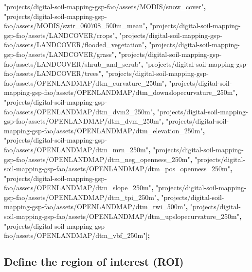 \documentclass[
  10pt,
  b5paper,
  oneside]{book}
\newenvironment{Shaded}{\begin{snugshade}}{\end{snugshade}}
\newcommand{\NormalTok}[1]{#1}
\newcommand{\OperatorTok}[1]{\textcolor[rgb]{0.81,0.36,0.00}{\textbf{#1}}}
\newcommand{\StringTok}[1]{\textcolor[rgb]{0.31,0.60,0.02}{#1}}
\begin{document}
\begin{Shaded}
\begin{Highlighting}[]
\StringTok{"projects/digital{-}soil{-}mapping{-}gsp{-}fao/assets/MODIS/snow\_cover"}\OperatorTok{,}
\StringTok{"projects/digital{-}soil{-}mapping{-}gsp{-}fao/assets/MODIS/swir\_060708\_500m\_mean"}\OperatorTok{,}
\StringTok{"projects/digital{-}soil{-}mapping{-}gsp{-}fao/assets/LANDCOVER/crops"}\OperatorTok{,}
\StringTok{"projects/digital{-}soil{-}mapping{-}gsp{-}fao/assets/LANDCOVER/flooded\_vegetation"}\OperatorTok{,}
\StringTok{"projects/digital{-}soil{-}mapping{-}gsp{-}fao/assets/LANDCOVER/grass"}\OperatorTok{,}
\StringTok{"projects/digital{-}soil{-}mapping{-}gsp{-}fao/assets/LANDCOVER/shrub\_and\_scrub"}\OperatorTok{,}
\StringTok{"projects/digital{-}soil{-}mapping{-}gsp{-}fao/assets/LANDCOVER/trees"}\OperatorTok{,}
\StringTok{"projects/digital{-}soil{-}mapping{-}gsp{-}fao/assets/OPENLANDMAP/dtm\_curvature\_250m"}\OperatorTok{,}
\StringTok{"projects/digital{-}soil{-}mapping{-}gsp{-}fao/assets/OPENLANDMAP/dtm\_downslopecurvature\_250m"}\OperatorTok{,}
\StringTok{"projects/digital{-}soil{-}mapping{-}gsp{-}fao/assets/OPENLANDMAP/dtm\_dvm2\_250m"}\OperatorTok{,}
\StringTok{"projects/digital{-}soil{-}mapping{-}gsp{-}fao/assets/OPENLANDMAP/dtm\_dvm\_250m"}\OperatorTok{,}
\StringTok{"projects/digital{-}soil{-}mapping{-}gsp{-}fao/assets/OPENLANDMAP/dtm\_elevation\_250m"}\OperatorTok{,}
\StringTok{"projects/digital{-}soil{-}mapping{-}gsp{-}fao/assets/OPENLANDMAP/dtm\_mrn\_250m"}\OperatorTok{,}
\StringTok{"projects/digital{-}soil{-}mapping{-}gsp{-}fao/assets/OPENLANDMAP/dtm\_neg\_openness\_250m"}\OperatorTok{,}
\StringTok{"projects/digital{-}soil{-}mapping{-}gsp{-}fao/assets/OPENLANDMAP/dtm\_pos\_openness\_250m"}\OperatorTok{,}
\StringTok{"projects/digital{-}soil{-}mapping{-}gsp{-}fao/assets/OPENLANDMAP/dtm\_slope\_250m"}\OperatorTok{,}
\StringTok{"projects/digital{-}soil{-}mapping{-}gsp{-}fao/assets/OPENLANDMAP/dtm\_tpi\_250m"}\OperatorTok{,}
\StringTok{"projects/digital{-}soil{-}mapping{-}gsp{-}fao/assets/OPENLANDMAP/dtm\_twi\_500m"}\OperatorTok{,}
\StringTok{"projects/digital{-}soil{-}mapping{-}gsp{-}fao/assets/OPENLANDMAP/dtm\_upslopecurvature\_250m"}\OperatorTok{,}
\StringTok{"projects/digital{-}soil{-}mapping{-}gsp{-}fao/assets/OPENLANDMAP/dtm\_vbf\_250m"}\NormalTok{]}\OperatorTok{;}
\end{Highlighting}
\end{Shaded}

\hypertarget{define-the-region-of-interest-roi}{%
\subsection{Define the region of interest (ROI)}\label{define-the-region-of-interest-roi}}
\end{document}
